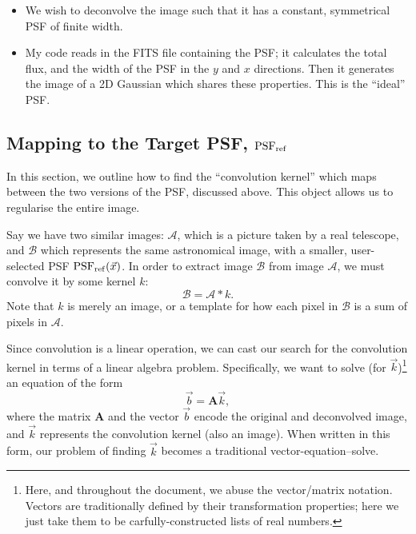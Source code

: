\documentclass[letterpaper, 11pt]{article}
\def\psfref{\ensuremath{{\rm PSF_{ref}}}\xspace}
\begin{document}
\begin{itemize}
	\item We wish to deconvolve the image such that it has a constant, symmetrical PSF of finite width.
	\item My code reads in the FITS file containing the PSF; it calculates the total flux, and the width of the PSF in the $y$ and $x$ directions. Then it generates the image of a 2D Gaussian which shares these properties. This is the ``ideal'' PSF.
\end{itemize}

\subsection{Mapping to the Target PSF, \psfref}
\label{sec:kernel}

In this section, we outline how to find the ``convolution kernel'' which maps between the two versions of the PSF, discussed above. This object allows us to regularise the entire image.

Say we have two similar images: $\mathcal{A}$, which is a picture taken by a real telescope, and $\mathcal{B}$ which represents the same astronomical image, with a smaller, user-selected PSF $\psfref(\vec x)$. In order to extract image $\mathcal B$ from image $\mathcal A$, we must convolve it by some kernel $k$:
\begin{equation}
	\mathcal B = \mathcal A \ast k.
\end{equation}
Note that $k$ is merely an image, or a template for how each pixel in $\mathcal B$ is a sum of pixels in  $\mathcal A$.

Since convolution is a linear operation, we can cast our search for the convolution kernel in terms of a linear algebra problem. Specifically, we want to solve (for $\vec k$)\footnote{Here, and throughout the document, we abuse the vector/matrix notation. Vectors are traditionally defined by their transformation properties; here we just take them to be carfully-constructed lists of real numbers.} an equation of the form
\begin{equation}\label{eqn:vector}
	\vec b = \mathbf{A} \vec k,
\end{equation}
where the matrix $\mathbf{A}$ and the vector $\vec b$ encode the original and deconvolved image, and $\vec k$ represents the convolution kernel (also an image). When written in this form, our problem of finding $\vec k$ becomes a traditional vector-equation--solve.
\end{document}
